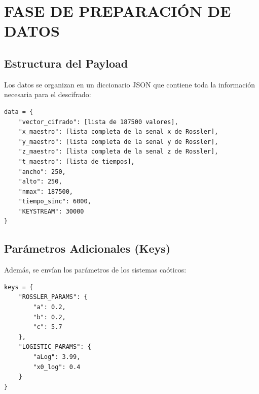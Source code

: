 \documentclass[12pt,a4paper]{article}
\begin{document}
\section{FASE DE PREPARACIÓN DE DATOS}

\subsection{Estructura del Payload}

Los datos se organizan en un diccionario JSON que contiene toda la información necesaria para el descifrado:

\begin{lstlisting}
data = {
    "vector_cifrado": [lista de 187500 valores],
    "x_maestro": [lista completa de la senal x de Rossler],
    "y_maestro": [lista completa de la senal y de Rossler],
    "z_maestro": [lista completa de la senal z de Rossler],
    "t_maestro": [lista de tiempos],
    "ancho": 250,
    "alto": 250,
    "nmax": 187500,
    "tiempo_sinc": 6000,
    "KEYSTREAM": 30000
}
\end{lstlisting}

\subsection{Parámetros Adicionales (Keys)}

Además, se envían los parámetros de los sistemas caóticos:

\begin{lstlisting}
keys = {
    "ROSSLER_PARAMS": {
        "a": 0.2,
        "b": 0.2,
        "c": 5.7
    },
    "LOGISTIC_PARAMS": {
        "aLog": 3.99,
        "x0_log": 0.4
    }
}
\end{lstlisting}
\end{document}
